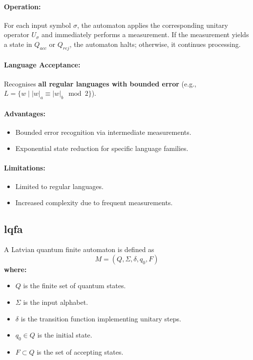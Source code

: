 \paragraph{Operation:}  
For each input symbol \( \sigma \), the automaton applies the corresponding unitary operator \( U_\sigma \) and immediately performs a measurement. If the measurement yields a state in \( Q_{acc} \) or \( Q_{rej} \), the automaton halts; otherwise, it continues processing.

\paragraph{Language Acceptance:}  
Recognises \textbf{all regular languages with bounded error} (e.g., \( L = \{w \mid |w|_a \equiv |w|_b \mod 2\} \)).

\paragraph{Advantages:}
\begin{itemize}
    \item Bounded error recognition via intermediate measurements.
    \item Exponential state reduction for specific language families.
\end{itemize}

\paragraph{Limitations:}
\begin{itemize}
    \item Limited to regular languages.
    \item Increased complexity due to frequent measurements.
\end{itemize}

\subsection{\gls{lqfa}}
\label{subsec:lqfa}
\begin{definition}
A Latvian quantum finite automaton is defined as 
\[
M = (Q, \Sigma, \delta, q_0, F)
\]
\textbf{where:}
\begin{itemize}
    \item \( Q \) is the finite set of quantum states.
    \item \( \Sigma \) is the input alphabet.
    \item \( \delta \) is the transition function implementing unitary steps.
    \item \( q_0 \in Q \) is the initial state.
    \item \( F \subset Q \) is the set of accepting states.
\end{itemize}
\end{definition}

